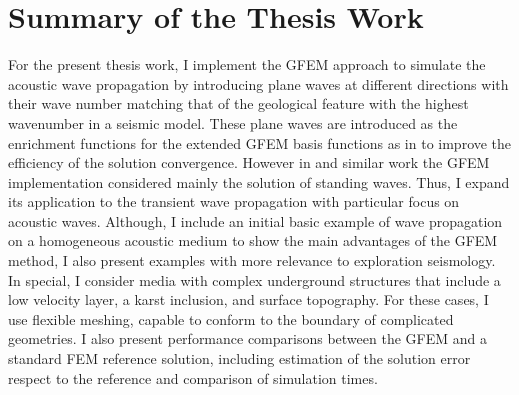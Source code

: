 \section{Summary of the Thesis Work}
For the present thesis work, I implement the GFEM approach to simulate the acoustic wave propagation by introducing plane waves at different directions with their wave number matching that of the geological feature with the highest wavenumber in a seismic model. These plane waves are introduced as the enrichment functions for the extended GFEM basis functions as in \cite{Strouboulis2006} to improve the efficiency of the solution convergence. However in \cite{Strouboulis2006} and similar work  \cite{Strouboulis2008, ElKacimi2009} the GFEM  implementation considered mainly the solution of standing waves. Thus, I expand its application to the transient wave propagation with particular focus on acoustic waves. Although, I  include an initial basic example of wave propagation on a homogeneous acoustic medium to show the main advantages of the GFEM method, I also present  examples with more relevance to exploration seismology. In special, I  consider media with complex underground structures that include a low velocity layer, a karst inclusion, and surface topography. For these cases, I use flexible meshing, capable to conform to the boundary of complicated geometries. I also present performance comparisons between the GFEM and a standard FEM reference solution, including estimation of the solution error respect to the reference and comparison of simulation times.


